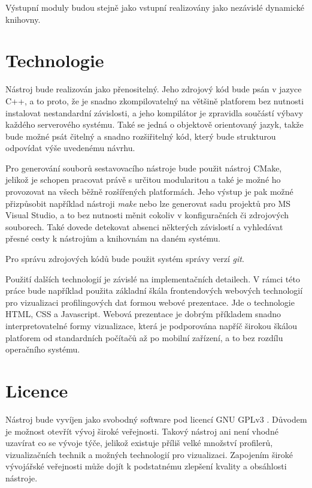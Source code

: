 \documentclass[czech,BP]{thesiskiv}
\begin{document}
Výstupní moduly budou stejně jako vstupní realizovány jako nezávislé dynamické knihovny.

\section{Technologie}

Nástroj bude realizován jako přenositelný. Jeho zdrojový kód bude psán v jazyce C++, a to proto, že je snadno zkompilovatelný na většině platforem bez nutnosti instalovat nestandardní závislosti, a jeho kompilátor je zpravidla součástí výbavy každého serverového systému. Také se jedná o objektově orientovaný jazyk, takže bude možné psát čitelný a snadno rozšiřitelný kód, který bude strukturou odpovídat výše uvedenému návrhu.

Pro generování souborů sestavovacího nástroje bude použit nástroj CMake, jelikož je schopen pracovat právě s určitou modularitou a také je možné ho provozovat na všech běžně rozšířených platformách. Jeho výstup je pak možné přizpůsobit například nástroji \emph{make} nebo lze generovat sadu projektů pro MS Visual Studio, a to bez nutnosti měnit cokoliv v konfiguračních či zdrojových souborech. Také dovede detekovat absenci některých závislostí a vyhledávat přesné cesty k nástrojům a knihovnám na daném systému.

Pro správu zdrojových kódů bude použit systém správy verzí \emph{git}.

Použití dalších technologií je závislé na implementačních detailech. V rámci této práce bude například použita základní škála frontendových webových technologií pro vizualizaci profilingových dat formou webové prezentace. Jde o technologie HTML, CSS a Javascript. Webová prezentace je dobrým příkladem snadno interpretovatelné formy vizualizace, která je podporována napříč širokou škálou platforem od standardních počítačů až po mobilní zařízení, a to bez rozdílu operačního systému.

\section{Licence}

Nástroj bude vyvíjen jako svobodný software pod licencí GNU GPLv3 \cite{gplv3}. Důvodem je možnost otevřít vývoj široké veřejnosti. Takový nástroj ani není vhodné uzavírat co se vývoje týče, jelikož existuje příliš velké množství profilerů, vizualizačních technik a možných technologií pro vizualizaci. Zapojením široké vývojářské veřejnosti může dojít k podstatnému zlepšení kvality a obsáhlosti nástroje.
\end{document}
